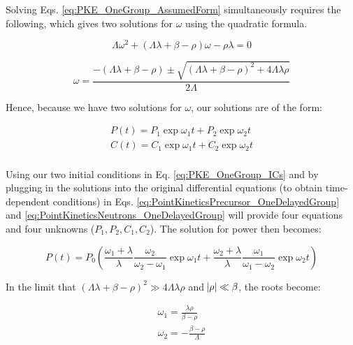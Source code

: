 \documentclass[10pt]{article}
\begin{document}
\begin{flushleft}
Solving Eqs. \ref{eq:PKE_OneGroup_AssumedForm} simultaneously requires the following, which gives two solutions for \(\omega\) using the quadratic formula.  

\begin{equation}
\label{eq:RequiredPKE}
\Lambda\omega^2+(\Lambda\lambda+\beta-\rho)\omega-\rho\lambda=0
\end{equation} 

\begin{equation}
\label{eq:PKEomega}
\omega=\frac{-(\Lambda\lambda+\beta-\rho)\pm\sqrt{(\Lambda\lambda+\beta-\rho)^2+4\Lambda\lambda\rho}}{2\Lambda}
\end{equation} 

Hence, because we have two solutions for \(\omega\), our solutions are of the form:

\begin{equation}
\label{eq:PKE_Solutions_OneGroup}
\begin{aligned}
P(t)=P_1\exp{\omega_1 t}+P_2\exp{\omega_2 t}\\
C(t)=C_1\exp{\omega_1 t}+C_2\exp{\omega_2 t}\\
\end{aligned}
\end{equation} 

Using our two initial conditions in Eq. \ref{eq:PKE_OneGroup_ICs} and by plugging in the solutions into the original differential equations (to obtain time-dependent conditions) in Eqs. \ref{eq:PointKineticsPrecursor_OneDelayedGroup} and \ref{eq:PointKineticsNeutrons_OneDelayedGroup} will provide four equations and four unknowns (\(P_1, P_2, C_1, C_2\)). The solution for power then becomes:

\begin{equation}
\label{eq:PowerPKE}
P(t)=P_0\left(\frac{\omega_1+\lambda}{\lambda}\frac{\omega_2}{\omega_2-\omega_1}\exp{\omega_1 t} + \frac{\omega_2+\lambda}{\lambda}\frac{\omega_1}{\omega_1-\omega_2}\exp{\omega_2 t}\right)
\end{equation} 

In the limit that \((\Lambda\lambda+\beta-\rho)^2 \gg 4\Lambda\lambda\rho\) and \(\abs{\rho}\ll\beta\), the roots become:

\begin{equation}
\label{eq:omegaPKE2}
\begin{aligned}
\omega_1=\frac{\lambda\rho}{\beta-\rho}\\
\omega_2=-\frac{\beta-\rho}{\Lambda}\\
\end{aligned}
\end{equation} 


\end{flushleft}
\end{document}
